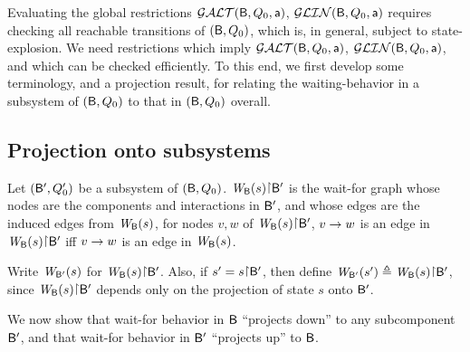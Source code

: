 
   \label{s:local.preamble}
%   

Evaluating the global restrictions $\GAO(\B,Q_0,\act)$, $\GLin(\B,Q_0,\act)$ requires checking all reachable transitions of
$(\B, Q_0)$, which is, in general, subject to state-explosion.
We need restrictions which imply $\GAO(\B,Q_0,\act)$, $\GLin(\B,Q_0,\act)$,
and which can be checked efficiently.
%
To this end, we first develop some terminology, and a projection result, for relating the waiting-behavior in a
subsystem of $(\B,Q_0)$ to that in $(\B,Q_0)$ overall.



\subsection{Projection onto subsystems}
\label{s:projection}

\begin{definition} \label{defn:projWgraph}
Let $(\B', Q'_0)$ be a subsystem of $(\B, Q_0)$. 
$\wfg{\B}{s} \pj \B'$ is the wait-for graph whose nodes are the
components and interactions in $\B'$, and whose edges are the induced
edges from $\wfg{\B}{s}$, \ie for nodes $v, w$ of $\wfg{\B}{s} \pj \B'$,
$v \ar w$ is an edge in $\wfg{\B}{s} \pj \B'$ iff $v \ar w$ is an edge in $\wfg{\B}{s}$.

Write $\lwfg{\B}{s}{\B'}$ for $\wfg{\B}{s} \pj \B'$.
Also, if $s' = s \pj \B'$, then define
$\lwfg{\B}{s'}{\B'} \df \wfg{\B}{s} \pj \B'$, since $\wfg{\B}{s} \pj \B'$ depends only
on the projection of state $s$ onto $\B'$.
\end{definition}

We now show that wait-for behavior in $\B$ ``projects down''
to any subcomponent $\B'$, and that wait-for behavior in $\B'$ ``projects up'' to $\B$.


